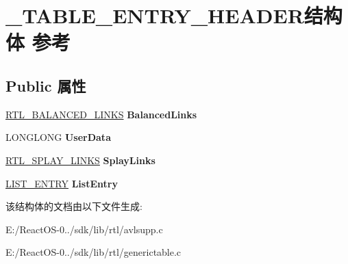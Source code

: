 \hypertarget{struct___t_a_b_l_e___e_n_t_r_y___h_e_a_d_e_r}{}\section{\+\_\+\+T\+A\+B\+L\+E\+\_\+\+E\+N\+T\+R\+Y\+\_\+\+H\+E\+A\+D\+E\+R结构体 参考}
\label{struct___t_a_b_l_e___e_n_t_r_y___h_e_a_d_e_r}
\subsection*{Public 属性}
\begin{DoxyCompactItemize}
\item 
\mbox{\label{struct___t_a_b_l_e___e_n_t_r_y___h_e_a_d_e_r_a7f38bb19b3df34a67f30bf019745414b}} 
\hyperlink{struct___r_t_l___b_a_l_a_n_c_e_d___l_i_n_k_s}{R\+T\+L\+\_\+\+B\+A\+L\+A\+N\+C\+E\+D\+\_\+\+L\+I\+N\+KS} {\bfseries Balanced\+Links}
\item 
\mbox{\label{struct___t_a_b_l_e___e_n_t_r_y___h_e_a_d_e_r_aded165e4d6cee8bf335ba518453f9743}} 
L\+O\+N\+G\+L\+O\+NG {\bfseries User\+Data}
\item 
\mbox{\label{struct___t_a_b_l_e___e_n_t_r_y___h_e_a_d_e_r_aa092eec40214dfba44441e6d961d1fb8}} 
\hyperlink{struct___r_t_l___s_p_l_a_y___l_i_n_k_s}{R\+T\+L\+\_\+\+S\+P\+L\+A\+Y\+\_\+\+L\+I\+N\+KS} {\bfseries Splay\+Links}
\item 
\mbox{\label{struct___t_a_b_l_e___e_n_t_r_y___h_e_a_d_e_r_acfb6d8a40f5ac418405edc971c79d2cb}} 
\hyperlink{struct___l_i_s_t___e_n_t_r_y}{L\+I\+S\+T\+\_\+\+E\+N\+T\+RY} {\bfseries List\+Entry}
\end{DoxyCompactItemize}


该结构体的文档由以下文件生成\+:\begin{DoxyCompactItemize}
\item 
E\+:/\+React\+O\+S-\/0../sdk/lib/rtl/avlsupp.\+c\item 
E\+:/\+React\+O\+S-\/0../sdk/lib/rtl/generictable.\+c\end{DoxyCompactItemize}
